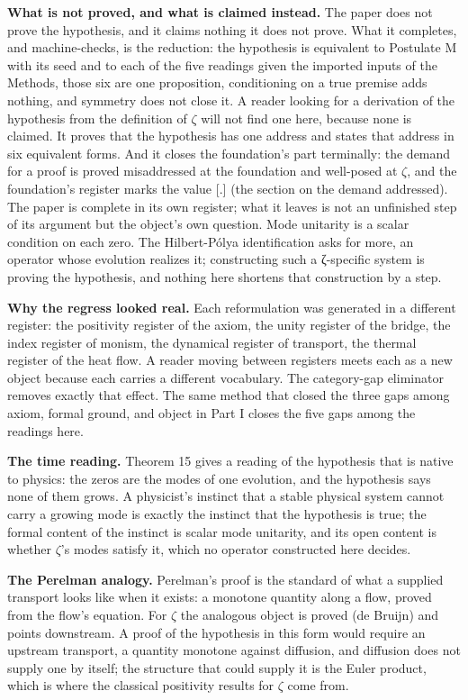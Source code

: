 \documentclass[10pt]{article}
\begin{document}
\textbf{What is not proved, and what is claimed instead.} The paper does
not prove the hypothesis, and it claims nothing it does not prove. What
it completes, and machine-checks, is the reduction: the hypothesis is
equivalent to Postulate M with its seed and to each of the five readings
given the imported inputs of the Methods, those six are one proposition,
conditioning on a true premise adds nothing, and symmetry does not close
it. A reader looking for a derivation of the hypothesis from the
definition of \(\zeta\) will not find one here, because none is claimed.
It proves that the hypothesis has one address and states that address in
six equivalent forms. And it closes the foundation's part terminally:
the demand for a proof is proved misaddressed at the foundation and
well-posed at \(\zeta\), and the foundation's register marks the value
{[}.{]} (the section on the demand addressed). The paper is complete in
its own register; what it leaves is not an unfinished step of its
argument but the object's own question. Mode unitarity is a scalar
condition on each zero. The Hilbert-Pólya identification asks for more,
an operator whose evolution realizes it; constructing such a ζ-specific
system is proving the hypothesis, and nothing here shortens that
construction by a step.

\textbf{Why the regress looked real.} Each reformulation was generated
in a different register: the positivity register of the axiom, the unity
register of the bridge, the index register of monism, the dynamical
register of transport, the thermal register of the heat flow. A reader
moving between registers meets each as a new object because each carries
a different vocabulary. The category-gap eliminator removes exactly that
effect. The same method that closed the three gaps among axiom, formal
ground, and object in Part I closes the five gaps among the readings
here.

\textbf{The time reading.} Theorem 15 gives a reading of the hypothesis
that is native to physics: the zeros are the modes of one evolution, and
the hypothesis says none of them grows. A physicist's instinct that a
stable physical system cannot carry a growing mode is exactly the
instinct that the hypothesis is true; the formal content of the instinct
is scalar mode unitarity, and its open content is whether \(\zeta\)'s
modes satisfy it, which no operator constructed here decides.

\textbf{The Perelman analogy.} Perelman's proof is the standard of what
a supplied transport looks like when it exists: a monotone quantity
along a flow, proved from the flow's equation. For \(\zeta\) the
analogous object is proved (de Bruijn) and points downstream. A proof of
the hypothesis in this form would require an upstream transport, a
quantity monotone against diffusion, and diffusion does not supply one
by itself; the structure that could supply it is the Euler product,
which is where the classical positivity results for \(\zeta\) come from.
\end{document}
